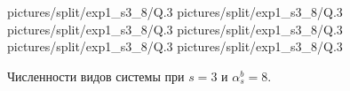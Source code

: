\begin{figure}[H]
    \centering
       {pictures/split/exp1_s3_8/Q}{.3}
      {pictures/split/exp1_s3_8/Q}{.3}
      {pictures/split/exp1_s3_8/Q}{.3}
      {pictures/split/exp1_s3_8/Q}{.3}
      {pictures/split/exp1_s3_8/Q}{.3}
     {pictures/split/exp1_s3_8/Q}{.3}
\caption{Численности видов системы при \(s=3\) и \(\alpha^b_s = 8\).}  \label{fig:split_exp1_s3_8}
\end{figure}